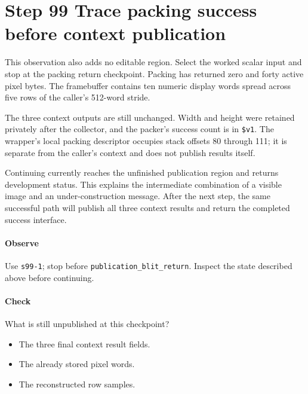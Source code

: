\section{Step 99 Trace packing success before context publication}
This observation also adds no editable region. Select the worked scalar input and stop at the packing return checkpoint. Packing has returned zero and forty active pixel bytes. The framebuffer contains ten numeric display words spread across five rows of the caller’s 512-word stride.

The three context outputs are still unchanged. Width and height were retained privately after the collector, and the packer’s success count is in \texttt{\$v1}. The wrapper’s local packing descriptor occupies stack offsets 80 through 111; it is separate from the caller’s context and does not publish results itself.

Continuing currently reaches the unfinished publication region and returns development status. This explains the intermediate combination of a visible image and an under-construction message. After the next step, the same successful path will publish all three context results and return the completed success interface.

\paragraph{Observe} Use \texttt{s99-1}; stop before \texttt{publication\_blit\_return}. Inspect the state described above before continuing.

\paragraph{Check} What is still unpublished at this checkpoint?
\begin{itemize}
  \item[A.] The three final context result fields.
  \item[B.] The already stored pixel words.
  \item[C.] The reconstructed row samples.
\end{itemize}
